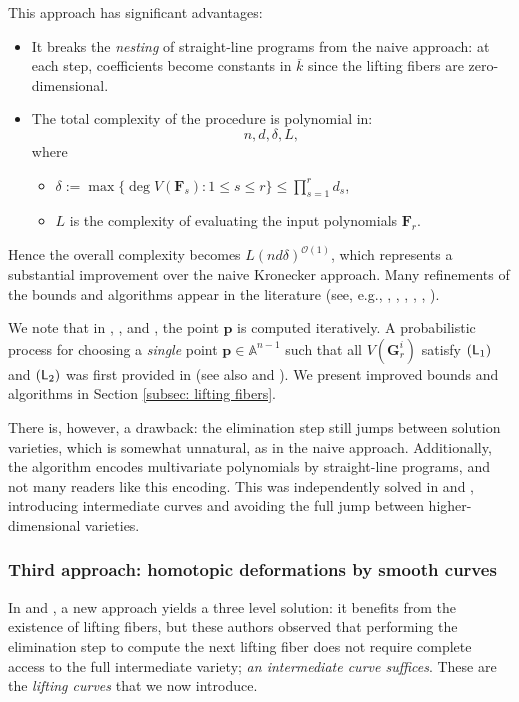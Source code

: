 \documentclass[pdflatex,sn-basic]{sn-jnl}%
\theoremstyle{thmstyleone}%
\theoremstyle{thmstyletwo}%
\theoremstyle{thmstylethree}%
\theoremstyle{definition}
\numberwithin{equation}{section}
\newcommand{\bfs}{\boldsymbol}
\newcommand{\A}{\mathbb A}
\begin{document}
This approach has significant advantages:
%
\begin{itemize}
  \item It breaks the {\em nesting} of straight-line programs from
  the naive approach: at each step, coefficients become constants
in $\overline{k}$ since the lifting fibers are zero-dimensional.
\item The total complexity of the procedure is polynomial
in:
  $$n,d,\delta,L,$$
  where
%
\begin{itemize}
  \item $\delta:=\max\{\deg V(\bfs F_s):1\le s\le r\}\le \prod_{s=1}^rd_s$,
  \item $L$ is the complexity of evaluating the input polynomials $\bfs
  F_r$.
  \end{itemize}
\end{itemize}
%
Hence the overall complexity becomes $L(nd\delta)^{\mathcal{O}(1)}$,
which represents a substantial improvement over the naive Kronecker
approach. Many refinements of the bounds and algorithms appear in
the literature (see, e.g., \cite{GiLeSa01}, \cite{HeMaWa01},
\cite{Lecerf03}, \cite{CaMa06a}, \cite{DuLe08}, \cite{HoLe21}).

We note that in \cite{GiHaHeMoMoPa97}, \cite{GiHeMoMoPa98}, and
\cite{GiHeMoPa97}, the point $\bfs p$ is computed iteratively. A
probabilistic process for choosing a {\em single} point $\bfs p\in\A^{n-1}$
such that all $V(\bfs G_r^i)$ satisfy $({\sf L}_1)$ and $({\sf
L}_2)$ was first provided in \cite{HeMaWa01} (see also
\cite{CaMa06a} and \cite{GiMa19}). We present improved bounds and
algorithms in Section \ref{subsec: lifting fibers}.

There is, however, a drawback: the elimination step still jumps
between solution varieties, which is somewhat unnatural, as in the
naive approach. Additionally, the algorithm encodes multivariate
polynomials by straight-line programs, and not many readers like
this encoding. This was independently solved in \cite{GiLeSa01} and
\cite{HeMaWa01}, introducing intermediate curves and avoiding the
full jump between higher-dimensional varieties.
%
%
\subsubsection{Third approach: homotopic deformations by
smooth curves}\label{subsec: third approach inro}
%
In \cite{GiLeSa01} and \cite{HeMaWa01}, a new approach yields a
three level solution: it benefits from the existence of lifting
fibers, but these authors observed that performing the elimination
step to compute the next lifting fiber does not require
complete access to the full intermediate variety; {\em an
intermediate curve suffices}. These are the {\em lifting curves}
that we now introduce.
\end{document}
